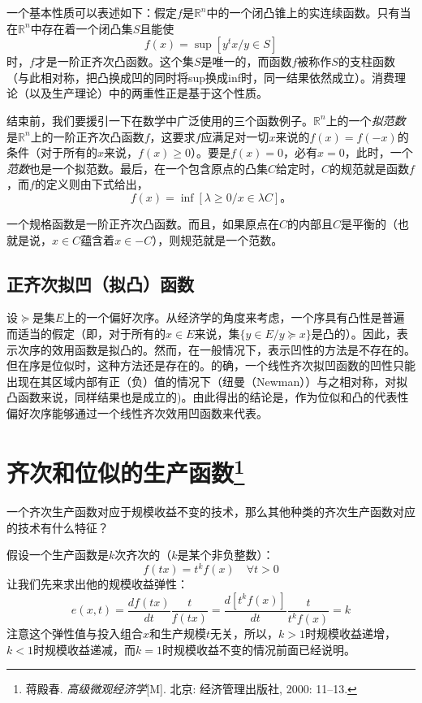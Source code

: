 一个基本性质可以表述如下：假定$f$是$\mathbb{R}^n$中的一个闭凸锥上的实连续函数。只有当在$\mathbb{R}^n$中存在着一个闭凸集$S$且能使
\[f(x) = \sup [y^t x/y \in S]\]
时，$f$才是一阶正齐次凸函数。这个集$S$是唯一的，而函数$f$被称作$S$的支柱函数（与此相对称，把凸换成凹的同时将sup换成inf时，同一结果依然成立）。消费理论（以及生产理论）中的两重性正是基于这个性质。

结束前，我们要援引一下在数学中广泛使用的三个函数例子。$\mathbb{R}^n$上的一个{\em 拟范数}是$\mathbb{R}^n$上的一阶正齐次凸函数$f$，这要求$f$应满足对一切$x$来说的$f(x) = f(-x)$的条件（对于所有的$x$来说，$f(x) \ge 0$）。要是$f(x)=0$，必有$x=0$，此时，一个{\em 范数}也是一个拟范数。最后，在一个包含原点的凸集$C$给定时，$C$的规范就是函数$f$，而$f$的定义则由下式给出，
\[f(x) = \inf [\lambda  \ge 0/x \in \lambda C] \text{。}\]

一个规格函数是一阶正齐次凸函数。而且，如果原点在$C$的内部且$C$是平衡的（也就是说，$x \in C$蕴含着$x \in -C$），则规范就是一个范数。

\subsection{正齐次拟凹（拟凸）函数}

设$\succcurlyeq$是集$E$上的一个偏好次序。从经济学的角度来考虑，一个序具有凸性是普遍而适当的假定（即，对于所有的$x \in E$来说，集$\{y \in E / y \succcurlyeq x\}$是凸的）。因此，表示次序的效用函数是拟凸的。然而，在一般情况下，表示凹性的方法是不存在的。但在序是位似时，这种方法还是存在的。的确，一个线性齐次拟凹函数的凹性只能出现在其区域内部有正（负）值的情况下（纽曼（Newman））与之相对称，对拟凸函数来说，同样结果也是成立的)。由此得出的结论是，作为位似和凸的代表性偏好次序能够通过一个线性齐次效用凹函数来代表。

\section[齐次和位似的生产函数]{齐次和位似的生产函数\footnote{蒋殿春. {\itshape 高级微观经济学}[M]. 北京: 经济管理出版社, 2000: 11--13.}}
%
一个齐次生产函数对应于规模收益不变的技术，那么其他种类的齐次生产函数对应的技术有什么特征？

假设一个生产函数是$k$次齐次的（$k$是某个非负整数）：
\[f(tx) = t^k f(x) \quad \forall t > 0\]
让我们先来求出他的规模收益弹性：
\[e(x,t) = \frac{{df(tx)}}{{dt}}\frac{t}{{f(tx)}} = \frac{{d[{t^k}f(x)]}}{{dt}}\frac{t}{{{t^k}f(x)}} = k\]
注意这个弹性值与投入组合$x$和生产规模$t$无关，所以，$k>1$时规模收益递增，$k<1$时规模收益递减，而$k=1$时规模收益不变的情况前面已经说明。

